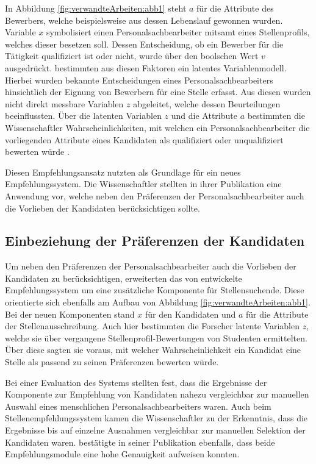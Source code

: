 In Abbildung \ref{fig:verwandteArbeiten:abb1} steht $a$ für die Attribute des Bewerbers, welche beispielsweise aus dessen Lebenslauf gewonnen wurden. Variable $x$ symbolisiert einen Personalsachbearbeiter mitsamt eines Stellenprofils, welches dieser besetzen soll. Dessen Entscheidung, ob ein Bewerber für die Tätigkeit qualifiziert ist oder nicht, wurde über den boolschen Wert $v$ ausgedrückt. \textcite[S. 4ff.]{faerber:2003} bestimmten aus diesen Faktoren ein latentes Variablenmodell. Hierbei wurden bekannte Entscheidungen eines Personalsachbearbeiters hinsichtlich der Eignung von Bewerbern für eine Stelle erfasst. Aus diesen wurden nicht direkt messbare Variablen $z$ abgeleitet, welche dessen Beurteilungen beeinflussten. Über die latenten Variablen $z$ und die Attribute $a$ bestimmten die Wissenschaftler Wahrscheinlichkeiten, mit welchen ein Personalsachbearbeiter die vorliegenden Attribute eines Kandidaten als qualifiziert oder unqualifiziert bewerten würde \cite[S. 4ff.]{faerber:2003}.

Diesen Empfehlungsansatz nutzten \textcite[S. 4f.]{malinowski:2006} als Grundlage für ein neues Empfehlungssystem. Die Wissenschaftler stellten in ihrer Publikation eine Anwendung vor, welche neben den Präferenzen der Personalsachbearbeiter auch die Vorlieben der Kandidaten berücksichtigen sollte.

\subsection{Einbeziehung der Präferenzen der Kandidaten}
\label{ch:verwandteArbeiten:aufDemPEFitBasierendeBilateraleSysteme:einbeziehungKandidaten}
Um neben den Präferenzen der Personalsachbearbeiter auch die Vorlieben der Kandidaten zu berücksichtigen, erweiterten \textcite[S. 4f.]{malinowski:2006} das von \textcite[S. 4ff.]{faerber:2003} entwickelte Empfehlungssystem um eine zusätzliche Komponente für Stellensuchende. Diese orientierte sich ebenfalls am Aufbau von Abbildung \ref{fig:verwandteArbeiten:abb1}. Bei der neuen Komponenten stand $x$ für den Kandidaten und $a$ für die Attribute der Stellenausschreibung. Auch hier bestimmten die Forscher latente Variablen $z$, welche sie über vergangene Stellenprofil-Bewertungen von Studenten ermittelten. Über diese sagten sie voraus, mit welcher Wahrscheinlichkeit ein Kandidat eine Stelle als passend zu seinen Präferenzen bewerten würde.

Bei einer Evaluation des Systems stellten \textcite[S. 6f.]{malinowski:2006} fest, dass die Ergebnisse der Komponente zur Empfehlung von Kandidaten nahezu vergleichbar zur manuellen Auswahl eines menschlichen Personalsachbearbeiters waren. Auch beim Stellenempfehlungssystem kamen die Wissenschaftler zu der Erkenntnis, dass die Ergebnisse bis auf einzelne Ausnahmen vergleichbar zur manuellen Selektion der Kandidaten waren. \textcite[S. 7]{keim:2007} bestätigte in seiner Publikation ebenfalls, dass beide Empfehlungsmodule eine hohe Genauigkeit aufweisen konnten.

